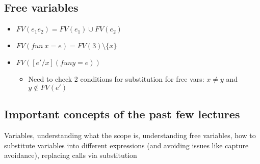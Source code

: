 \documentclass[11pt]{article}
\begin{document}
\subsection{Free variables}
\label{sec:org4fe61ea}
\begin{itemize}
\item \(FV(e_1 e_2) = FV(e_1) \cup FV(e_2)\)
\item \(FV(fun \ x = e) = FV(3) \setminus \{x\}\)
\item \(FV([e'/x] (fun y = e))\)
\begin{itemize}
\item Need to check 2 conditions for substitution for free vars: \(x \neq y\) and \(y \notin FV(e')\)
\end{itemize}
\end{itemize}
\subsection{Important concepts of the past few lectures}
\label{sec:orgb6bd393}
Variables, understanding what the scope is, understanding free variables, how to substitute variables into different expressions (and avoiding issues like capture avoidance), replacing calls via substitution
\end{document}
